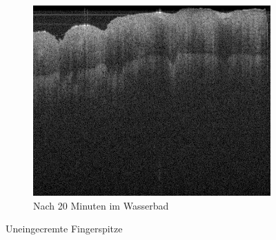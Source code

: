 \documentclass[german, %
parskip=full, %
bibliography=totoc, %
]{scrartcl}
\begin{document}
\begin{figure}[ht]
\begin{subfigure}[b]{0.3\textwidth}
	   \includegraphics[width=\textwidth]{finger_uncreme_3}
		 \caption{Nach 20 Minuten im Wasserbad}
	\end{subfigure}
  \caption{Uneingecremte Fingerspitze}
	\label{fig:uncreme}
\end{figure}
\end{document}
